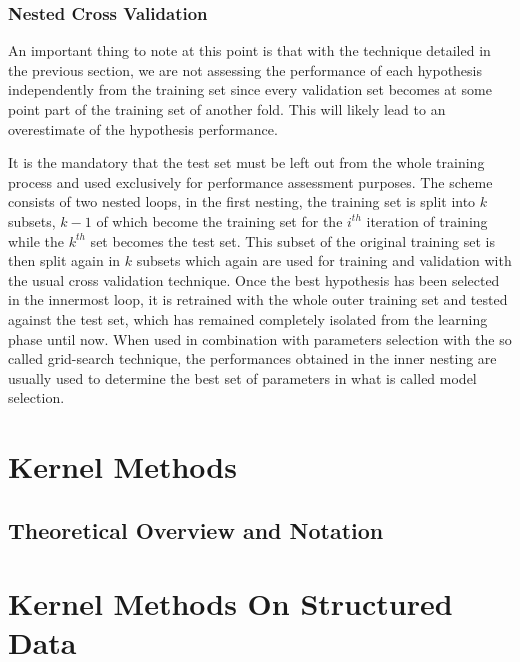 \subsubsection{Nested Cross Validation}
An important thing to note at this point is that with the technique detailed in
the previous section, we are not assessing the performance of each hypothesis
independently from the training set since every validation set becomes at some
point part of the training set of another fold.
This will likely lead to an overestimate of the hypothesis performance.

It is the mandatory that the test set must be left out from the whole training
process and used exclusively for performance assessment purposes.
The scheme consists of two nested loops, in the first nesting, the training set
is split into $k$ subsets, $k-1$ of which become the training set for the
$i^{th}$ iteration of training while the $k^{th}$ set becomes the test set.
This subset of the original training set is then split again in $k$ subsets
which again are used for training and validation with the usual cross validation
technique.
Once the best hypothesis has been selected in the innermost loop, it is retrained
with the whole outer training set and tested against the test set, which has
remained completely isolated from the learning phase until now.
When used in combination with parameters selection with the so called grid-search
technique, the performances obtained in the inner nesting are usually used to
determine the best set of parameters in what is called model selection.


\section{Kernel Methods}
\label{sec:kernel}
\subsection{Theoretical Overview and Notation}


\section{Kernel Methods On Structured Data}
\label{sec:graphkernels}

